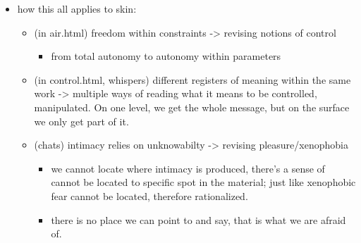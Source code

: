 \documentclass[11pt]{article}
\begin{document}
\begin{itemize}
\item how this all applies to skin:
\begin{itemize}
\item (in air.html) freedom within constraints -> revising notions of
control
\begin{itemize}
\item from total autonomy to autonomy within parameters
\end{itemize}
\item (in control.html, whispers) different registers of meaning within
the same work -> multiple ways of reading what it means to be
controlled, manipulated. On one level, we get the whole message,
but on the surface we only get part of it.
\item (chats) intimacy relies on unknowabilty -> revising
pleasure/xenophobia
\begin{itemize}
\item we cannot locate where intimacy is produced, there's a sense of
cannot be located to specific spot in the material; just like
xenophobic fear cannot be located, therefore rationalized.
\item there is no place we can point to and say, that is what we are
afraid of.
\end{itemize}
\end{itemize}
\end{itemize}
\end{document}
